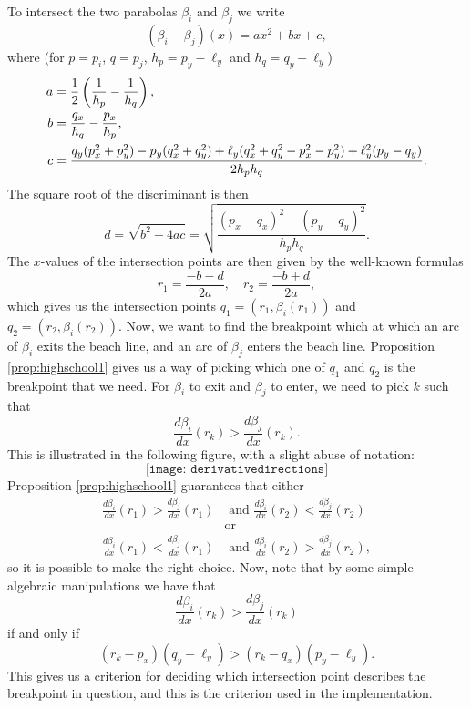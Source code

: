 To intersect the two parabolas $\beta_i$ and $\beta_j$ we write
\[
    (\beta_i - \beta_j)(x) = a x^2 + b x + c,
\]
where (for $p = p_i$, $q = p_j$, $h_p = p_y - \ell_y$ and $h_q = q_y - \ell_y$)
\begin{align*}
    a &= \frac{1}{2} \left(\frac{1}{h_p} - \frac{1}{h_q}\right), \\
    b &= \frac{q_x}{h_q} - \frac{p_x}{h_p}, \\
    c &= \frac{q_y(p_x^2 + p_y^2) - p_y (q_x^2 + q_y^2) + \ell_y (q_x^2 + q_y^2 - p_x^2 - p_y^2) + \ell_y^2 (p_y - q_y)}{2 h_p h_q}.
\end{align*}
The square root of the discriminant is then
\[
    d = \sqrt{b^2 - 4 ac} = \sqrt{\frac{(p_x - q_x)^2 + (p_y - q_y)^2}{h_p h_q}}.
\]
The $x$-values of the intersection points are then given by the well-known formulas
\[
    r_1 = \frac{-b - d}{2 a}, \quad
    r_2 = \frac{-b + d}{2 a},
\]
which gives us the intersection points $q_1 = (r_1, \beta_i(r_1))$ and $q_2 = (r_2, \beta_i(r_2))$. Now, we want to find the breakpoint which at which an arc of $\beta_i$ exits the beach line, and an arc of $\beta_j$ enters the beach line. Proposition \ref{prop:highschool1} gives us a way of picking which one of $q_1$ and $q_2$ is the breakpoint that we need. For $\beta_i$ to exit and $\beta_j$ to enter, we need to pick $k$ such that
\[
    \frac{d \beta_i}{dx}(r_k) > \frac{d \beta_j}{dx}(r_k).
\]
This is illustrated in the following figure, with a slight abuse of notation:
\[
    \texttt{[image: derivativedirections]}
\]
Proposition \ref{prop:highschool1} guarantees that either
\begin{align*}
    \frac{d \beta_i}{dx}(r_1) > \frac{d \beta_j}{dx}(r_1) &\text{ and } \frac{d \beta_i}{dx}(r_2) < \frac{d \beta_j}{dx}(r_2) \\
    &\text{or} \\
    \frac{d \beta_i}{dx}(r_1) < \frac{d \beta_j}{dx}(r_1) &\text{ and } \frac{d \beta_i}{dx}(r_2) > \frac{d \beta_j}{dx}(r_2),
\end{align*}
so it is possible to make the right choice. Now, note that by some simple algebraic manipulations we have that
\[
    \frac{d \beta_i}{dx}(r_k) > \frac{d \beta_j}{dx}(r_k)
\]
if and only if
\[
    (r_k - p_x) (q_y - \ell_y) > (r_k - q_x) (p_y - \ell_y).
\]
This gives us a criterion for deciding which intersection point describes the breakpoint in question, and this is the criterion used in the implementation.

